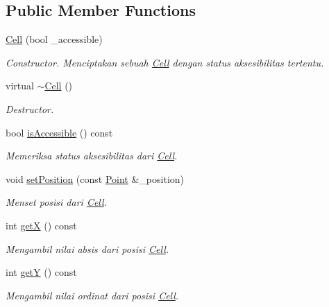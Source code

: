 \subsection*{Public Member Functions}
\begin{DoxyCompactItemize}
\item 
\hyperlink{classCell_a38aede1bc2a5d27ee327109c1cb646ab}{Cell} (bool \+\_\+accessible)
\begin{DoxyCompactList}\small\item\em Constructor. Menciptakan sebuah \hyperlink{classCell}{Cell} dengan status aksesibilitas tertentu. \end{DoxyCompactList}\item 
\hypertarget{classCell_a9fa559f7a28e2b4336c6879ca09304d8}{virtual \hyperlink{classCell_a9fa559f7a28e2b4336c6879ca09304d8}{$\sim$\+Cell} ()}\label{classCell_a9fa559f7a28e2b4336c6879ca09304d8}

\begin{DoxyCompactList}\small\item\em Destructor. \end{DoxyCompactList}\item 
bool \hyperlink{classCell_aef7a11f9388d041cebb90d15ab2890ad}{is\+Accessible} () const 
\begin{DoxyCompactList}\small\item\em Memeriksa status aksesibilitas dari \hyperlink{classCell}{Cell}. \end{DoxyCompactList}\item 
void \hyperlink{classCell_a53dfa4264f46ca0a8c65004731793aa9}{set\+Position} (const \hyperlink{classPoint}{Point} \&\+\_\+position)
\begin{DoxyCompactList}\small\item\em Menset posisi dari \hyperlink{classCell}{Cell}. \end{DoxyCompactList}\item 
int \hyperlink{classCell_a78d82b277e8fb2e1c3e70286bcc85314}{get\+X} () const 
\begin{DoxyCompactList}\small\item\em Mengambil nilai absis dari posisi \hyperlink{classCell}{Cell}. \end{DoxyCompactList}\item 
int \hyperlink{classCell_a2df3d69f5d0c10a1e1f02c5f89045e0a}{get\+Y} () const 
\begin{DoxyCompactList}\small\item\em Mengambil nilai ordinat dari posisi \hyperlink{classCell}{Cell}. \end{DoxyCompactList}\end{DoxyCompactItemize}
